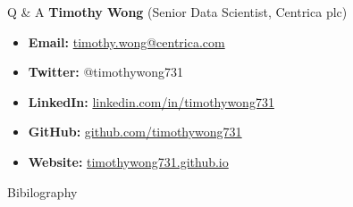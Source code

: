 \documentclass{beamer}
\begin{document}
\begin{frame}{Q \& A}
\textbf{Timothy Wong} (Senior Data Scientist, Centrica plc)
  \begin{itemize}
    \item \textbf{Email:} \url{timothy.wong@centrica.com}
    \item \textbf{Twitter:} @timothywong731
    \item \textbf{LinkedIn:} \url{linkedin.com/in/timothywong731}
    \item \textbf{GitHub:} \url{github.com/timothywong731}
    \item \textbf{Website:} \url{timothywong731.github.io}
  \end{itemize}
\end{frame}

\begin{frame}[allowframebreaks]{Bibilography}
  
  
\end{frame}
\end{document}
